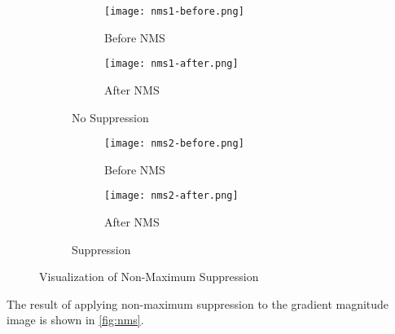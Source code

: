 \begin{figure}
    \centering
    \begin{subfigure}[b]{0.40\textwidth}
        \centering
        \begin{subfigure}[b]{0.40\textwidth}
            \renewcommand\thesubfigure{\alph{subfigure}1}
            \centering
            \texttt{[image: nms1-before.png]}
            \caption{Before NMS}
            \label{fig:nms1-before}
        \end{subfigure}
        \hfill
        \begin{subfigure}[b]{0.40\textwidth}
            \addtocounter{subfigure}{-1}
            \renewcommand\thesubfigure{\alph{subfigure}2}
            \centering
            \texttt{[image: nms1-after.png]}
            \caption{After NMS}
            \label{fig:nms1-after}
        \end{subfigure}

        \addtocounter{subfigure}{-1}
        \caption{No Suppression}
        \label{fig:nms1}

    \end{subfigure}
    \hfill

    \vspace{0.75cm}

    \begin{subfigure}[b]{0.40\textwidth}
        \centering
        \begin{subfigure}[b]{0.40\textwidth}
            \renewcommand\thesubfigure{\alph{subfigure}1}
            \centering
            \texttt{[image: nms2-before.png]}
            \caption{Before NMS}
            \label{fig:nms2-before}
        \end{subfigure}
        \hfill
        \begin{subfigure}[b]{0.40\textwidth}
            \addtocounter{subfigure}{-1}
            \renewcommand\thesubfigure{\alph{subfigure}2}
            \centering
            \texttt{[image: nms2-after.png]}
            \caption{After NMS}
            \label{fig:nms2-after}
        \end{subfigure}
        \addtocounter{subfigure}{-1}
        \caption{Suppression}
        \label{fig:nms2}
    \end{subfigure}
    \caption{Visualization of Non-Maximum Suppression}
    \label{fig:nms-examples}
\end{figure}

The result of applying non-maximum suppression to the gradient magnitude image is shown in \autoref{fig:nms}.

